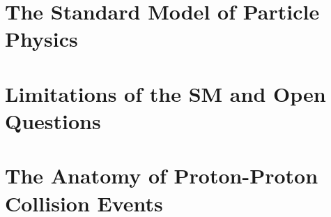 \section{The Standard Model of Particle Physics}
\label{sec:sm}



\section{Limitations of the SM and Open Questions}
\label{sec:limitations}


\section{The Anatomy of Proton-Proton Collision Events}
\label{sec:anatomy}




